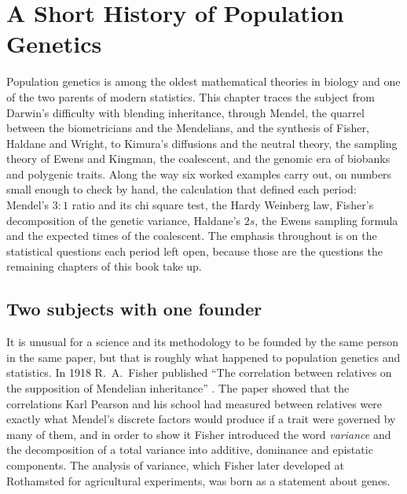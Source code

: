 \chapter{A Short History of Population Genetics}\label{ch:intro}

\begin{chaptersummary}
Population genetics is among the oldest mathematical theories in biology and one of the two parents of
modern statistics. This chapter traces the subject from Darwin's difficulty with blending
inheritance, through Mendel, the quarrel between the biometricians and the Mendelians, and the
synthesis of Fisher, Haldane and Wright, to Kimura's diffusions and the neutral theory, the sampling
theory of Ewens and Kingman, the coalescent, and the genomic era of biobanks and polygenic traits.
Along the way six worked examples carry out, on numbers small enough to check by hand, the
calculation that defined each period: Mendel's $3:1$ ratio and its chi square test, the Hardy
Weinberg law, Fisher's decomposition of the genetic variance, Haldane's $2s$, the Ewens sampling
formula and the expected times of the coalescent. The emphasis throughout is on the statistical
questions each period left open, because those are the questions the remaining chapters of this
book take up.
\end{chaptersummary}

\section{Two subjects with one founder}

It is unusual for a science and its methodology to be founded by the same person in the same
paper, but that is roughly what happened to population genetics and statistics. In 1918
R.~A.\ Fisher published ``The correlation between relatives on the supposition of Mendelian
inheritance'' \citep{intro:fisher1918}. The paper showed that the correlations Karl Pearson and
his school had measured between relatives were exactly what Mendel's discrete factors would
produce if a trait were governed by many of them, and in order to show it Fisher introduced the
word \emph{variance} and the decomposition of a total variance into additive, dominance and
epistatic components. The analysis of variance, which Fisher later developed at Rothamsted for
agricultural experiments, was born as a statement about genes.

